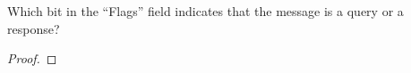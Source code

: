 \documentclass[../../main.tex]{subfiles}
\begin{document}
\begin{wts}
Which bit in the “Flags” field indicates that the message is a query or a response?
\end{wts}
\begin{proof}

\end{proof}
\end{document}
